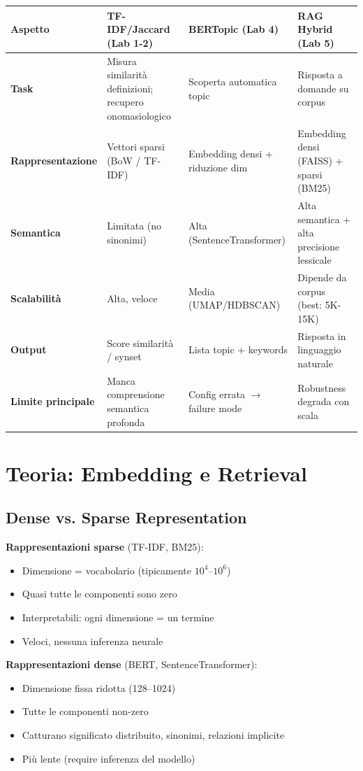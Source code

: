 \documentclass[12pt,a4paper]{article}
\begin{document}
\begin{center}
\begin{tabular}{p{2.8cm}p{3.5cm}p{3.5cm}p{3.5cm}}
\toprule
\textbf{Aspetto} & \textbf{TF-IDF/Jaccard (Lab 1-2)} & \textbf{BERTopic (Lab 4)} & \textbf{RAG Hybrid (Lab 5)} \\
\midrule
\textbf{Task} & Misura similarit\`a definizioni; recupero onomasiologico & Scoperta automatica topic & Risposta a domande su corpus \\
\midrule
\textbf{Rappresentazione} & Vettori sparsi (BoW / TF-IDF) & Embedding densi + riduzione dim & Embedding densi (FAISS) + sparsi (BM25) \\
\midrule
\textbf{Semantica} & Limitata (no sinonimi) & Alta (SentenceTransformer) & Alta semantica + alta precisione lessicale \\
\midrule
\textbf{Scalabilit\`a} & Alta, veloce & Media (UMAP/HDBSCAN) & Dipende da corpus (best: 5K-15K) \\
\midrule
\textbf{Output} & Score similarit\`a / synset & Lista topic + keywords & Risposta in linguaggio naturale \\
\midrule
\textbf{Limite principale} & Manca comprensione semantica profonda & Config errata $\to$ failure mode & Robustness degrada con scala \\
\bottomrule
\end{tabular}
\end{center}

\section{Teoria: Embedding e Retrieval}

\subsection{Dense vs. Sparse Representation}

\begin{defbox}
\textbf{Rappresentazioni sparse} (TF-IDF, BM25):
\begin{itemize}
  \item Dimensione = vocabolario (tipicamente $10^4$--$10^6$)
  \item Quasi tutte le componenti sono zero
  \item Interpretabili: ogni dimensione = un termine
  \item Veloci, nessuna inferenza neurale
\end{itemize}

\textbf{Rappresentazioni dense} (BERT, SentenceTransformer):
\begin{itemize}
  \item Dimensione fissa ridotta (128--1024)
  \item Tutte le componenti non-zero
  \item Catturano significato distribuito, sinonimi, relazioni implicite
  \item Pi\`u lente (require inferenza del modello)
\end{itemize}
\end{defbox}
\end{document}

